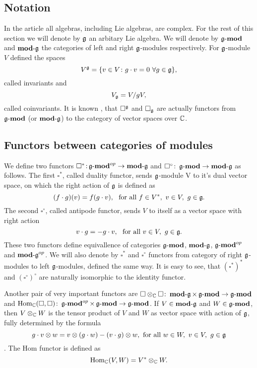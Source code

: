 % 

\subsection{Notation} \todo{$\CC_\lambda$}
In the article all algebras, including Lie algebras, are complex. 
For the rest of this section we will denote by $\mathfrak{g}$ an arbitary Lie algebra. We will
denote by $\operatorname{\mathbf{\mathfrak{g}-mod}}$ and $\operatorname{\mathbf{mod-\mathfrak{g}}}$ the categories of left and right $\mathfrak{g}$-modules respectively. 
For $\mathfrak{g}$-module $V$ defined the spaces 
\begin{equation}
    V^{\mathfrak{g}} = \{v\in V\colon g\cdot v = 0 ~ \forall g\in \mathfrak{g} \}, 
\end{equation}
called invariants and
\begin{equation}
    V_{\mathfrak{g}} = V/gV,
\end{equation}
called coinvariants. It is known , that $\square^{\mathfrak{g}}$ and $\square_{\mathfrak{g}}$ are actually functors
from $\operatorname{\mathbf{\mathfrak{g}-mod}}$ (or $\operatorname{\mathbf{mod-\mathfrak{g}}}$) to the category of vector spaces over $\mathbb{C}$.

\subsection{Functors between categories of modules}
We define two functors $\square^*\colon \\ \operatorname{\mathbf{\mathfrak{g}-mod}}^{op} \to \operatorname{\mathbf{mod-\mathfrak{g}}}$ and $\square^\circ\colon
\operatorname{\mathbf{\mathfrak{g}-mod}} \to \operatorname{\mathbf{mod-\mathfrak{g}}}$ as follows. The first $\square^*$, called duality functor, sends 
$\mathfrak{g}$-module V to it's dual vector space, on which the right action of $\mathfrak{g}$ is defined as 
\[
    (f\cdot g) (v) = f(g\cdot v),~\text{ for all } f\in V^*,~v \in V,~g\in\mathfrak{g}.
\]
The second $\square^\circ$, called antipode functor, sends $V$ to itself as a vector space with right
action
\[\label{test}
    v\cdot g = - g\cdot v,~\text{ for all } v \in V,~g\in\mathfrak{g}.
\]
These two functors define equivallence of categories $\operatorname{\mathbf{\mathfrak{g}-mod}}$, $\operatorname{\mathbf{mod-\mathfrak{g}}}$, $\operatorname{\mathbf{\mathfrak{g}-mod}}^{op}$
and $\operatorname{\mathbf{mod-\mathfrak{g}}}^{op}$. We will also denote by $\square^*$ and $\square^\circ$ functors from
category of right $\mathfrak{g}$-modules to left $\mathfrak{g}$-modules, defined the same way. It is easy to
see, that $(\square^*)^*$ and $(\square^\circ)^\circ$ are naturally isomorphic to the identity functor.

Another pair of very important functors are $\square \otimes_{\mathbb{C}} \square \colon \operatorname{\mathbf{mod-\mathfrak{g}}} \times
\operatorname{\mathbf{\mathfrak{g}-mod}} \to \operatorname{\mathbf{\mathfrak{g}-mod}}$ and $\operatorname{Hom}_{\mathbb{C}}(\square, \square)\colon \operatorname{\mathbf{\mathfrak{g}-mod}}^{op} \times
\operatorname{\mathbf{\mathfrak{g}-mod}} \to \operatorname{\mathbf{\mathfrak{g}-mod}}$. If $V \in \operatorname{\mathbf{mod-\mathfrak{g}}}$ and $W \in \operatorname{\mathbf{\mathfrak{g}-mod}}$, then $V \otimes_{\mathbb{C}} W$
is the tensor product of $V$ and $W$ as vector space with action of $\mathfrak{g}$, fully determined by the
formula
\[
    g\cdot v\otimes w = v\otimes (g\cdot w) - (v\cdot g) \otimes w, \text{ for all } w\in W,~v\in
    V,~ g\in \mathfrak{g} 
\].
The Hom functor is defined as 
\[
    \operatorname{Hom}_{\mathbb{C}}(V, W)=V^* \otimes_{\mathbb{C}} W.
\]


